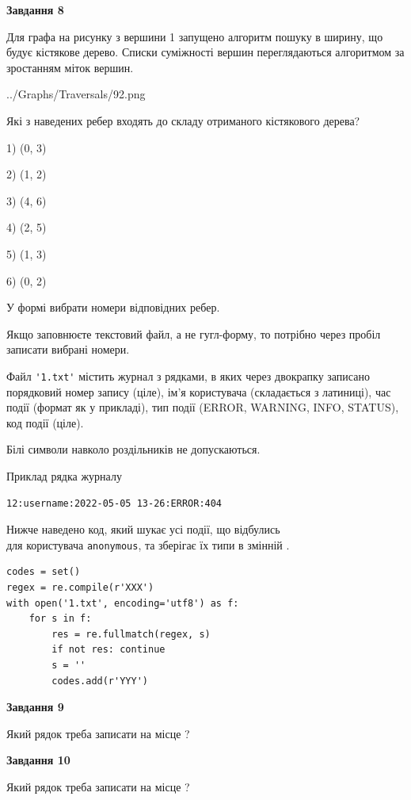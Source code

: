 \documentclass[12pt, ukrainian]{article}
\def\code#1{\Verb!#1!}
\begin{document}
{\begin {large}
{\begin {center}\textbf{Завдання 8}\end {center}}\par
Для графа на рисунку з вершини 1 запущено алгоритм пошуку в ширину, що будує кістякове дерево. Списки суміжності вершин переглядаються алгоритмом за зростанням міток вершин.\par
\begin{center}
	{../Graphs/Traversals/92.png}
\end{center}
\par Які з наведених ребер входять до складу отриманого кістякового дерева?\par
1) (0, 3)\par
2) (1, 2)\par
3) (4, 6)\par
4) (2, 5)\par
5) (1, 3)\par
6) (0, 2)\par
{\vskip 15pt} У формі вибрати номери відповідних ребер.


Якщо заповнюєте текстовий файл, а не гугл-форму, то потрібно через пробіл записа\-ти вибрані номери.\par
\newpage


Файл \code{'1.txt'} містить журнал з рядками, в яких через двокрапку записано поряд\-ко\-вий номер запису (ціле), ім'я користувача (складається з латиниці), час події (фор\-мат як у прикладі), тип події (ERROR, WARNING, INFO, STATUS), код події (ціле).

Білі символи навколо роздільників не допускаються.

Приклад рядка журналу



\begin{verbatim}
12:username:2022-05-05 13-26:ERROR:404
\end{verbatim}


Нижче наведено код, який шукає усі події, що відбулись\\ для користувача \code{anonymous}, та зберігає їх типи в змінній .



\begin{verbatim}
codes = set()
regex = re.compile(r'XXX')
with open('1.txt', encoding='utf8') as f:
    for s in f:
        res = re.fullmatch(regex, s)
        if not res: continue
        s = ''
        codes.add(r'YYY')
\end{verbatim}


{\begin {center}\textbf{Завдання 9}\end {center}}\par
Який рядок треба записати на місце  ?\par
\vspace{5mm}


{\begin {center}\textbf{Завдання 10}\end {center}}\par
Який рядок треба записати на місце  ?\par


\newpage


\end {large}}
\end{document}
